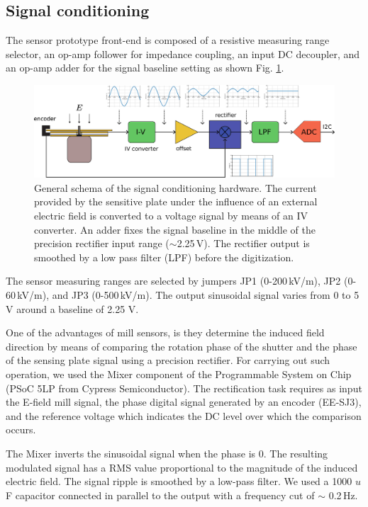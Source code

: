 \documentclass[letterpaper,12pt]{article}
\begin{document}
\subsection{Signal conditioning}

The sensor prototype front-end is composed of a resistive measuring range selector, an op-amp follower for impedance coupling, an input DC decoupler, and an op-amp adder for the signal baseline setting as shown Fig. \ref{emill_c}. 

\begin{figure}[h]
\begin{center}
\includegraphics[width=1\textwidth]{Figures/Emill_esquema.eps}
\caption{General schema of the signal conditioning hardware. The current provided by the sensitive plate under the influence of an external electric field is converted to a voltage signal by means of an IV converter. An adder fixes the signal baseline in the middle of the precision rectifier input range ($\sim$2.25\,V). The rectifier output is smoothed by a low pass filter (LPF) before the digitization.}
\label{emill_c}
\end{center}
\end{figure}

The sensor measuring ranges are selected by jumpers JP1 (0-200\,kV/m), JP2 (0-60\,kV/m), and JP3 (0-500\,kV/m). The output sinusoidal signal varies from 0 to 5 V around a baseline of 2.25 V.

One of the advantages of mill sensors, is they determine the induced field direction by means of comparing the rotation phase of the shutter and the phase of the sensing plate signal using a precision rectifier. For carrying out such operation, we used the Mixer component of the Programmable System on Chip (PSoC 5LP from Cypress Semiconductor). The rectification task requires as input the E-field mill signal, the phase digital signal generated by an encoder (EE-SJ3), and the reference voltage which indicates the DC level over which the comparison occurs.

The Mixer inverts the sinusoidal signal when the phase is 0. The resulting modulated signal has a RMS value proportional to the magnitude of the induced electric field. The signal ripple is smoothed by a low-pass filter. We used a 1000 $u$F capacitor connected in parallel to the output with a frequency cut of $\sim$ 0.2\,Hz.
\end{document}
